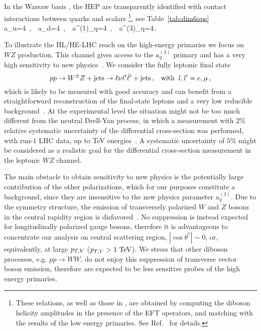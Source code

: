 In the Warsaw basis \cite{Grzadkowski:2010es}, the HEP are transparently identified with contact interactions between quarks and scalars \footnote{These relations, as well as those in  , are obtained by computing the diboson helicity amplitudes in the presence of the EFT operators, and matching with the results of the low energy primaries. See Ref.~\cite{Franceschini:2017ab} for details.}, see Table~\ref{tab:dim6ops}
\be
a_u=4\ ,\  \ a_d=4\ ,\ \  a^{(1)}_q=4\ ,\ \  a^{(3)}_q=4\,.
\ee


To illustrate the HL/HE-LHC reach on the high-energy primaries we focus on $WZ$ production. This channel gives access to the
$a_q^{(3)}$ primary and has a very high sensitivity to new physics~\cite{Franceschini:2017ab}. We consider the fully leptonic final state
$$
pp\to W^{\pm}Z + {\rm{jets}}\to \ell\nu\ell^{\prime}\bar{\ell}^{\prime} + {\rm{jets}} \,, \;\;\; {\rm{with}}\;\;l,l'=e,\mu\,,
$$ 
which is likely to be measured with good accuracy and can benefit from a straightforward reconstruction of the final-state
leptons and a very low reducible background~\cite{Aad:2016ett}. At the experimental level
the situation might not be too much different from the neutral Drell-Yan process, in which a measurement with $2\%$
relative systematic uncertainty of the differential cross-section was performed, with run-$1$ LHC data,
up to TeV energies~\cite{Aad:2016zzw}.
A systematic uncertainty of $5\%$ might be considered as a realistic goal for the differential cross-section measurement in the leptonic $WZ$ channel. 

The main obstacle to obtain sensitivity to new physics is the potentially large contribution of the other polarizations, which for our purposes constitute a background, since they are insensitive to the new physics parameter $a_{q}^{(3)}$. %
Due to the symmetry structure, the emission of transversely polarized $W$ and $Z$ bosons in the central rapidity region is disfavored~\cite{Franceschini:2017ab}. No suppression is instead expected for longitudinally polarized gauge bosons, therefore it is advantageous to concentrate our analysis on central scattering region, $|\cos \theta^*| \sim 0$, or, equivalently, at large $p_{T,V}$ ($p_{T,V} > 1\ {\rm TeV}$). We stress that other diboson processes, e.g. $pp \to WW$, do not enjoy this suppression of transverse vector boson emission, therefore are expected to be less sensitive probes of the high energy primaries. %

